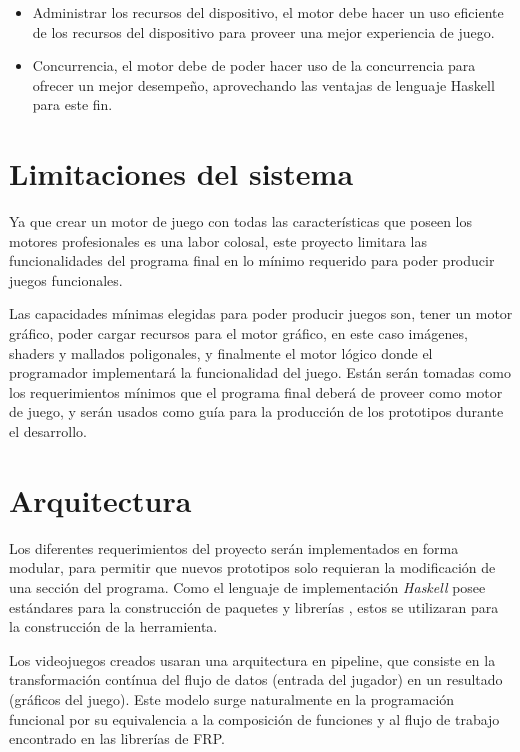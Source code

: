 \begin{itemize}
  \item Administrar los recursos del dispositivo, el motor debe hacer un uso eficiente de los recursos del dispositivo para proveer una mejor experiencia de juego.
  \item Concurrencia, el motor debe de poder hacer uso de la concurrencia para ofrecer un mejor desempeño, aprovechando las ventajas de lenguaje Haskell para este fin.
\end{itemize}

\section{Limitaciones del sistema}

Ya que crear un motor de juego con todas las características que poseen los motores profesionales es una labor colosal, este proyecto limitara las funcionalidades del programa final en lo mínimo requerido para poder producir juegos funcionales.

Las capacidades mínimas elegidas para poder producir juegos son, tener un  motor gráfico, poder cargar recursos para el motor gráfico, en este caso imágenes, shaders y mallados poligonales, y finalmente el motor lógico donde el programador implementará la funcionalidad del juego. Están serán tomadas como los requerimientos  mínimos que el programa final deberá de proveer como motor de juego, y serán usados como guía para la producción de los prototipos durante el desarrollo.

\section{Arquitectura}

Los diferentes requerimientos del proyecto serán implementados en forma modular, para permitir que nuevos prototipos solo requieran la modificación de una sección del programa. Como el lenguaje de implementación \emph{Haskell} posee estándares para la construcción de paquetes y librerías \cite{wiki:WriteAHaskellProgram}, estos se utilizaran para la construcción de la herramienta.

Los videojuegos creados usaran una arquitectura en pipeline, que consiste en la transformación contínua del flujo de datos (entrada del jugador) en un resultado (gráficos del juego). Este modelo surge naturalmente en la programación funcional por su equivalencia a la composición de funciones y al flujo de trabajo encontrado en las librerías de FRP.

